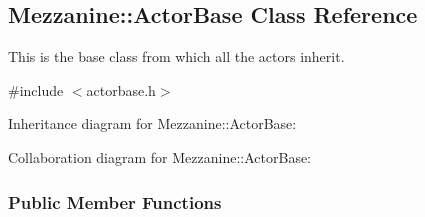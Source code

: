 \hypertarget{classMezzanine_1_1ActorBase}{\subsection{Mezzanine\-:\-:Actor\-Base Class Reference}
\label{classMezzanine_1_1ActorBase}
}


This is the base class from which all the actors inherit.  




{\ttfamily \#include $<$actorbase.\-h$>$}



Inheritance diagram for Mezzanine\-:\-:Actor\-Base\-:


Collaboration diagram for Mezzanine\-:\-:Actor\-Base\-:
\subsubsection*{Public Member Functions}
